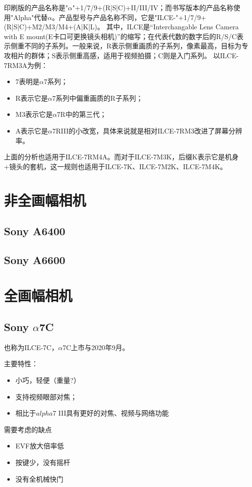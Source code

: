 \documentclass{ctexart}
\begin{document}
印刷版的产品名称是"$\alpha$"+1/7/9+(R|S|C)+II/III/IV；而书写版本的产品名称使用"Alpha"代替$\alpha$。产品型号与产品名称不同，它是"ILCE-"+1/7/9+(R|S|C)+M2/M3/M4+(A|K|L)。
其中，ILCE是“Interchangable Lens Camera with E mount(E卡口可更换镜头相机)”的缩写；在代表代数的数字后的R/S/C表示侧重不同的子系列。一般来说，R表示侧重画质的子系列，像素最高，目标为专攻相片的群体；S表示侧重高感，适用于视频拍摄；C则是入门系列。
以ILCE-7RM3A为例：
\begin{itemize}
    \item 7表明是$\alpha$7系列；
    \item R表示它是$\alpha$7系列中偏重画质的R子系列；
    \item M3表示它是$\alpha$7R中的第三代；
    \item A表示它是$\alpha$7RIII的小改宽，具体来说就是相对ILCE-7RM3改进了屏幕分辨率。
\end{itemize}
上面的分析也适用于ILCE-7RM4A。而对于ILCE-7M3K，后缀K表示它是机身+镜头的套机，这一规则也适用于ILCE-7K、ILCE-7M2K、ILCE-7M4K。


\section{非全画幅相机}
\subsection{Sony A6400}
\subsection{Sony A6600}

\section{全画幅相机}

\subsection{Sony $\alpha$7C}
也称为ILCE-7C，$\alpha$7C上市与2020年9月。

主要特性：
\begin{itemize}
    \item 小巧，轻便（重量?）
    \item 支持视频眼部对焦；
    \item 相比于$alpha$7 III具有更好的对焦、视频与网络功能
\end{itemize}
需要考虑的缺点
\begin{itemize}
    \item EVF放大倍率低
    \item 按键少，没有摇杆
    \item 没有全机械快门
\end{itemize}
\end{document}

